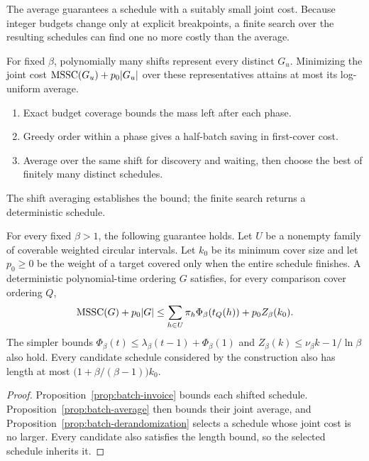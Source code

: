 The average guarantees a schedule with a suitably small joint cost.
Because integer budgets change only at explicit breakpoints, a finite
search over the resulting schedules can find one no more costly than
the average.

\begin{proposition}
\label{prop:batch-derandomization}
For fixed $\beta$, polynomially many shifts represent every distinct
$G_u$. Minimizing the joint cost
$\operatorname{MSSC}(G_u)+p_0|G_u|$ over these representatives attains at most
its log-uniform average.
\end{proposition}

\begin{proofstrategy}
\begin{enumerate}
\item Exact budget coverage bounds the mass left after each phase.
\item Greedy order within a phase gives a half-batch saving in first-cover cost.
\item Average over the same shift for discovery and waiting, then
      choose the best of finitely many distinct schedules.
\end{enumerate}
The shift averaging establishes the bound; the finite search returns a
deterministic schedule.
\end{proofstrategy}

\begin{lemma}\label{lem:mssc}
For every fixed $\beta>1$, the following guarantee holds.
Let $U$ be a nonempty family of coverable weighted circular intervals.
Let $k_0$ be its minimum cover size and let $p_0\ge0$ be the weight
of a target covered only when the entire schedule finishes.
A deterministic polynomial-time ordering $G$ satisfies, for every
comparison cover ordering $Q$,
\[
 \operatorname{MSSC}(G)+p_0|G|
 \le\sum_{h\in U}\pi_h\Phi_\beta(t_Q(h))+p_0 Z_\beta(k_0).
\]
The simpler bounds
$\Phi_\beta(t)\le\lambda_\beta(t-1)+\Phi_\beta(1)$ and
$Z_\beta(k)\le\nu_\beta k-1/\ln\beta$ also hold.
Every candidate schedule considered by the construction also has
length at most $\bigl(1+\beta/(\beta-1)\bigr)k_0$.
\end{lemma}
\begin{proof}
Proposition~\ref{prop:batch-invoice} bounds each shifted schedule.
Proposition~\ref{prop:batch-average} then bounds their joint average,
and Proposition~\ref{prop:batch-derandomization} selects a schedule
whose joint cost is no larger. Every candidate also satisfies the
length bound, so the selected schedule inherits it.
\end{proof}

